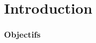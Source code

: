 
\begingroup

\part{Introduction}
 
 
\section{Objectifs}
 
%
%
%
%
% 
%
%
%
%
% 
%
%
% 
%
%
% 
% 
% 
% 
%
%
%
%
